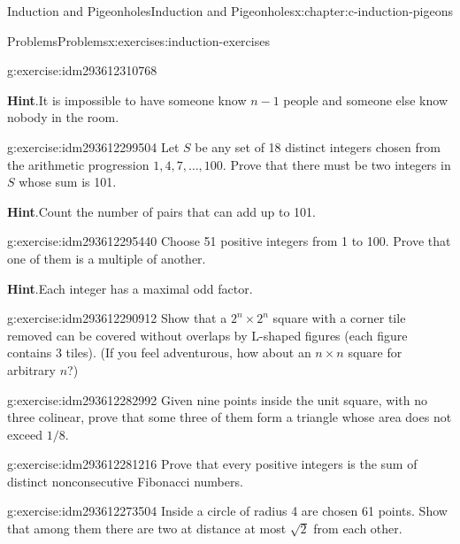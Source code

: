 \documentclass[twoside,10pt,]{book}
\newcommand{\blocktitlefont}{\relax}
\numberwithin{equation}{section}
\begin{document}
\begin{chapterptx}{Induction and Pigeonholes}{}{Induction and Pigeonholes}{}{}{x:chapter:c-induction-pigeons}
\begin{exercises-section}{Problems}{}{Problems}{}{}{x:exercises:induction-exercises}
\begin{divisionexercise}{2}{}{}{g:exercise:idm293612310768}
\par\smallskip%
\noindent\textbf{\blocktitlefont Hint}.\label{g:hint:idm293612300528}{}\hypertarget{g:hint:idm293612300528}{}\quad{}It is impossible to have someone know \(n-1\) people and someone else know nobody in the room.%
\end{divisionexercise}%
\begin{divisionexercise}{3}{}{}{g:exercise:idm293612299504}%
Let \(S\) be any set of 18 distinct integers chosen from the arithmetic progression \(1, 4, 7, \dots , 100\). Prove that there must be two integers in \(S\) whose sum is 101.%
\par\smallskip%
\noindent\textbf{\blocktitlefont Hint}.\label{g:hint:idm293612297808}{}\hypertarget{g:hint:idm293612297808}{}\quad{}Count the number of pairs that can add up to 101.%
\end{divisionexercise}%
\begin{divisionexercise}{4}{}{}{g:exercise:idm293612295440}%
Choose 51 positive integers from 1 to 100. Prove that one of them is a multiple of another.%
\par\smallskip%
\noindent\textbf{\blocktitlefont Hint}.\label{g:hint:idm293612291856}{}\hypertarget{g:hint:idm293612291856}{}\quad{}Each integer has a maximal odd factor.%
\end{divisionexercise}%
\begin{divisionexercise}{5}{}{}{g:exercise:idm293612290912}%
Show that a \(2^n \times  2^n\) square with a corner tile removed can be covered without overlaps by L-shaped figures (each figure contains 3 tiles). (If you feel adventurous, how about an \(n \times  n\) square for arbitrary \(n\)?)%
\end{divisionexercise}%
\begin{divisionexercise}{6}{}{}{g:exercise:idm293612282992}%
Given nine points inside the unit square, with no three colinear, prove that some three of them form a triangle whose area does not exceed \(1/8\).%
\end{divisionexercise}%
\begin{divisionexercise}{7}{}{}{g:exercise:idm293612281216}%
Prove that every positive integers is the sum of distinct nonconsecutive Fibonacci numbers.%
\end{divisionexercise}%
\begin{divisionexercise}{8}{}{}{g:exercise:idm293612273504}%
Inside a circle of radius 4 are chosen 61 points. Show that among them there are two at distance at most \(\sqrt{2}\) from each other.%
\end{divisionexercise}%

\end{exercises-section}
\end{chapterptx}
\end{document}
